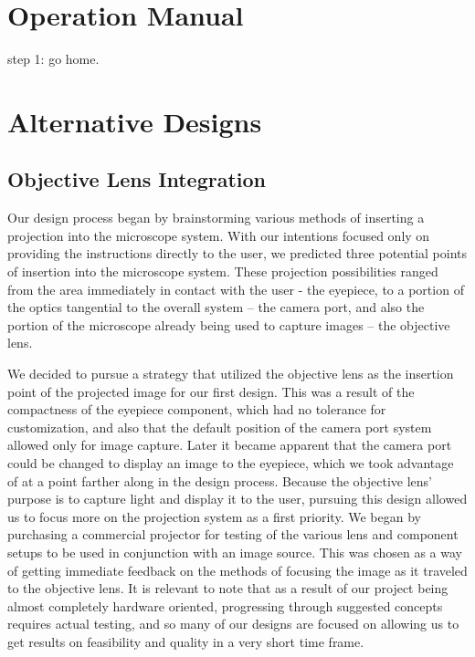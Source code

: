 \documentclass[12pt,a4paper]{article}
\begin{document}
\pagebreak
\begin{appendices}

\section{Operation Manual}


step 1: go home.

\section{Alternative Designs}
\subsection{Objective Lens Integration}
Our design process began by brainstorming various methods of inserting a projection into the microscope system.  With our intentions focused only on providing the instructions directly to the user, we predicted three potential points of insertion into the microscope system.  These projection possibilities ranged from the area immediately in contact with the user - the eyepiece, to a portion of the optics tangential to the overall system – the camera port, and also the portion of the microscope already being used to capture images – the objective lens.

We decided to pursue a strategy that utilized the objective lens as the insertion point of the projected image for our first design.  This was a result of the compactness of the eyepiece component, which had no tolerance for customization, and also that the default position of the camera port system allowed only for image capture.  Later it became apparent that the camera port could be changed to display an image to the eyepiece, which we took advantage of at a point farther along in the design process.
Because the objective lens’ purpose is to capture light and display it to the user, pursuing this design allowed us to focus more on the projection system as a first priority.  We began by purchasing a commercial projector for testing of the various lens and component setups to be used in conjunction with an image source.  This was chosen as a way of getting immediate feedback on the methods of focusing the image as it traveled to the objective lens.  It is relevant to note that as a result of our project being almost completely hardware oriented, progressing through suggested concepts requires actual testing, and so many of our designs are focused on allowing us to get results on feasibility and quality in a very short time frame.


\end{appendices}
\end{document}
